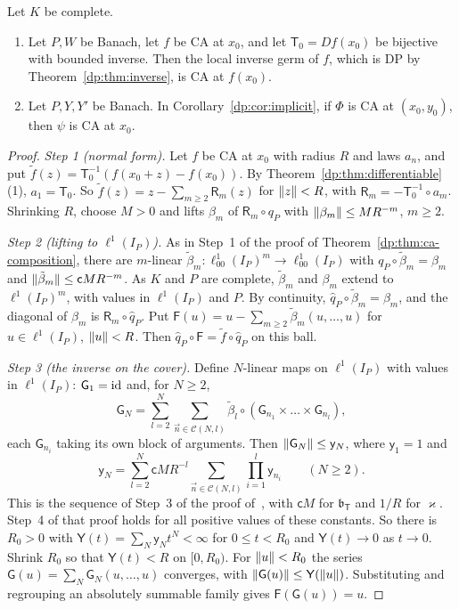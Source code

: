 \begin{theorem}\label{dp:thm:ca-inverse}
Let $K$ be complete.
\begin{enumerate}
\item Let $P,W$ be Banach, let $f$ be CA at $x_0$, and let $\mathsf T_0=Df(x_0)$ be bijective with bounded inverse. Then the local inverse germ of $f$, which is DP by Theorem~\ref{dp:thm:inverse}, is CA at $f(x_0)$.
\item Let $P,Y,Y'$ be Banach. In Corollary~\ref{dp:cor:implicit}, if $\Phi$ is CA at $(x_0,y_0)$, then $\psi$ is CA at $x_0$.
\end{enumerate}
\end{theorem}

\begin{proof}
\emph{Step 1 (normal form).} Let $f$ be CA at $x_0$ with radius $R$ and laws $a_n$, and put $\tilde f(z)=\mathsf T_0^{-1}(f(x_0+z)-f(x_0))$. By Theorem~\ref{dp:thm:differentiable}(1), $a_1=\mathsf T_0$. So $\tilde f(z)=z-\sum_{m\ge2}\mathsf R_m(z)$ for $\lVert z\rVert<R$, with $\mathsf R_m=-\mathsf T_0^{-1}\circ a_m$. Shrinking $R$, choose $M>0$ and lifts $\beta_m$ of $\mathsf R_m\circ q_P$ with $\lVert \beta_m\rVert\le MR^{-m}$, $m\ge2$.

\emph{Step 2 (lifting to $\ell^1(I_P)$).} As in Step~1 of the proof of Theorem~\ref{dp:thm:ca-composition}, there are $m$-linear $\tilde\beta_m\colon\ell^1_{00}(I_P)^m\to\ell^1_{00}(I_P)$ with $q_P\circ\tilde\beta_m=\beta_m$ and $\lVert \tilde\beta_m\rVert\le\mathsf cMR^{-m}$. As $K$ and $P$ are complete, $\tilde\beta_m$ and $\beta_m$ extend to $\ell^1(I_P)^m$, with values in $\ell^1(I_P)$ and $P$. By continuity, $\hat q_P\circ\tilde\beta_m=\beta_m$, and the diagonal of $\beta_m$ is $\mathsf R_m\circ\hat q_P$. Put $\mathsf F(u)=u-\sum_{m\ge2}\tilde\beta_m(u,\dots,u)$ for $u\in\ell^1(I_P)$, $\lVert u\rVert<R$. Then $\hat q_P\circ\mathsf F=\tilde f\circ\hat q_P$ on this ball.

\emph{Step 3 (the inverse on the cover).} Define $N$-linear maps on $\ell^1(I_P)$ with values in $\ell^1(I_P)$: $\mathsf G_1=\mathrm{id}$ and, for $N\ge2$,
\[
 \mathsf G_N=\sum_{l=2}^N\sum_{\vec n\in\mathcal C(N,l)}\tilde\beta_l\circ(\mathsf G_{n_1}\times\dots\times\mathsf G_{n_l}),
\]
each $\mathsf G_{n_i}$ taking its own block of arguments. Then $\lVert \mathsf G_N\rVert\le\mathsf y_N$, where $\mathsf y_1=1$ and
\[
 \mathsf y_N=\sum_{l=2}^N\mathsf cMR^{-l}\sum_{\vec n\in\mathcal C(N,l)}\prod_{i=1}^l\mathsf y_{n_i}\qquad(N\ge2).
\]
This is the sequence of Step~3 of the proof of~\cite[Lemma~Q.14]{I}, with $\mathsf cM$ for $\mathfrak b_{\mathsf T}$ and $1/R$ for $\varkappa$. Step~4 of that proof holds for all positive values of these constants. So there is $R_0>0$ with $\mathsf Y(t)=\sum_N\mathsf y_Nt^N<\infty$ for $0\le t<R_0$ and $\mathsf Y(t)\to0$ as $t\to0$. Shrink $R_0$ so that $\mathsf Y(t)<R$ on $[0,R_0)$. For $\lVert u\rVert<R_0$ the series $\mathsf G(u)=\sum_N\mathsf G_N(u,\dots,u)$ converges, with $\lVert \mathsf G(u)\rVert\le\mathsf Y(\lVert u\rVert)$. Substituting and regrouping an absolutely summable family gives $\mathsf F(\mathsf G(u))=u$.


\end{proof}

